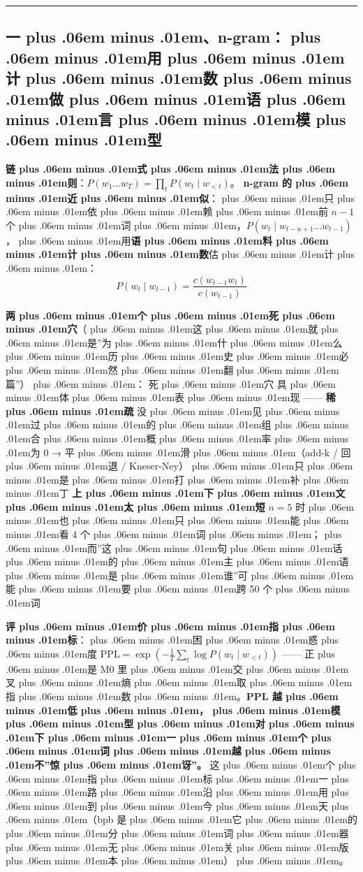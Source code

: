\documentclass[
]{article}
\def\zh#1{{\zhfont #1}}
\def\sym#1{{\symfont #1}}
\def\zhglue{\hskip0pt plus .06em minus .01em}
\begin{document}
\begin{center}\rule{0.5\linewidth}{0.5pt}\end{center}

\subsection{\zh{一\zhglue 、}n-gram\zh{：\zhglue 用\zhglue 计\zhglue 数\zhglue 做\zhglue 语\zhglue 言\zhglue 模\zhglue 型}}\label{ux4e00n-gramux7528ux8ba1ux6570ux505aux8bedux8a00ux6a21ux578b}

\textbf{\zh{链\zhglue 式\zhglue 法\zhglue 则}}\zh{：}\(P(w_1\dots w_T) = \prod_t P(w_t \mid w_{<t})\)\zh{。} \textbf{n-gram \zh{的\zhglue 近\zhglue 似}}\zh{：\zhglue 只\zhglue 依\zhglue 赖\zhglue 前} \(n-1\) \zh{个\zhglue 词\zhglue ，}\(P(w_t\mid w_{t-n+1}\dots w_{t-1})\)\zh{，\zhglue 用}\textbf{\zh{语\zhglue 料\zhglue 计\zhglue 数}}\zh{估\zhglue 计\zhglue ：} \[P(w_t\mid w_{t-1}) = \frac{c(w_{t-1}w_t)}{c(w_{t-1})}\]

\textbf{\zh{两\zhglue 个\zhglue 死\zhglue 穴}}\zh{（\zhglue 这\zhglue 就\zhglue 是}''\zh{为\zhglue 什\zhglue 么\zhglue 历\zhglue 史\zhglue 必\zhglue 然\zhglue 翻\zhglue 篇}''\zh{）\zhglue ：} \textbar{} \zh{死\zhglue 穴} \textbar{} \zh{具\zhglue 体\zhglue 表\zhglue 现} \textbar{} \textbar---\textbar---\textbar{} \textbar{} \textbf{\zh{稀\zhglue 疏}} \textbar{} \zh{没\zhglue 见\zhglue 过\zhglue 的\zhglue 组\zhglue 合\zhglue 概\zhglue 率\zhglue 为} 0 \sym{→} \zh{平\zhglue 滑\zhglue （}add-k / \zh{回\zhglue 退} / Kneser-Ney\zh{）\zhglue 只\zhglue 是\zhglue 打\zhglue 补\zhglue 丁} \textbar{} \textbar{} \textbf{\zh{上\zhglue 下\zhglue 文\zhglue 太\zhglue 短}} \textbar{} \(n=5\) \zh{时\zhglue 也\zhglue 只\zhglue 能\zhglue 看} 4 \zh{个\zhglue 词\zhglue ；\zhglue 而}''\zh{这\zhglue 句\zhglue 话\zhglue 的\zhglue 主\zhglue 语\zhglue 是\zhglue 谁}''\zh{可\zhglue 能\zhglue 要\zhglue 跨} 50 \zh{个\zhglue 词} \textbar{}

\textbf{\zh{评\zhglue 价\zhglue 指\zhglue 标}}\zh{：\zhglue 困\zhglue 惑\zhglue 度} \(\mathrm{PPL}=\exp(-\frac{1}{T}\sum_t \log P(w_t\mid w_{<t}))\) ------ \zh{正\zhglue 是} M0 \zh{里\zhglue 交\zhglue 叉\zhglue 熵\zhglue 取\zhglue 指\zhglue 数\zhglue 。}\textbf{PPL \zh{越\zhglue 低\zhglue ，\zhglue 模\zhglue 型\zhglue 对\zhglue 下\zhglue 一\zhglue 个\zhglue 词\zhglue 越\zhglue 不}''\zh{惊\zhglue 讶}''\zh{。}} \zh{这\zhglue 个\zhglue 指\zhglue 标\zhglue 一\zhglue 路\zhglue 沿\zhglue 用\zhglue 到\zhglue 今\zhglue 天\zhglue （}bpb \zh{是\zhglue 它\zhglue 的\zhglue 分\zhglue 词\zhglue 器\zhglue 无\zhglue 关\zhglue 版\zhglue 本\zhglue ）\zhglue 。}
\end{document}

